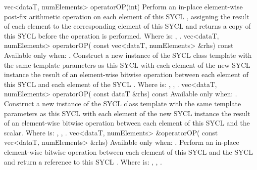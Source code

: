   \addRow
  {vec<dataT, numElements> operatorOP(int)}
  {
    Perform an in-place element-wise  post-fix arithmetic operation on each element of this SYCL , assigning the result of each element to the corresponding element of this SYCL  and returns a copy of this SYCL  before the operation is performed.
    \newline \newline
    Where  is: \codeinline{++}, \codeinline{--}.
  }
  \addRowTwoL
  {vec<dataT, numElements> operatorOP(}
  {  const vec<dataT, numElements> \&rhs) const}
  {
    Available only when: .
    \newline
    Construct a new instance of the SYCL  class template with the same template parameters as this SYCL  with each element of the new SYCL  instance the result of an element-wise  bitwise operation between each element of this SYCL  and each element of the  SYCL .
    \newline \newline
    Where  is: \codeinline{\&}, \codeinline{\|}, \codeinline{\^}.
  }
  \addRowTwoL
  {vec<dataT, numElements> operatorOP(}
  {  const dataT \&rhs) const}
  {
    Available only when: .
    \newline
    Construct a new instance of the SYCL  class template with the same template parameters as this SYCL  with each element of the new SYCL  instance the result of an element-wise  bitwise operation between each element of this SYCL  and the  scalar.
    \newline \newline
    Where  is: \codeinline{\&}, \codeinline{\|}, \codeinline{\^}.
  }
  \addRowTwoL
  {vec<dataT, numElements> \&operatorOP(}
  {  const vec<dataT, numElements> \&rhs)}
  {
    Available only when: .
    \newline
    Perform an in-place element-wise  bitwise operation between each element of this SYCL  and the  SYCL  and return a reference to this SYCL .
    \newline \newline
    Where  is: \codeinline{\&=}, \codeinline{\|=}, \codeinline{\^=}.
  }
